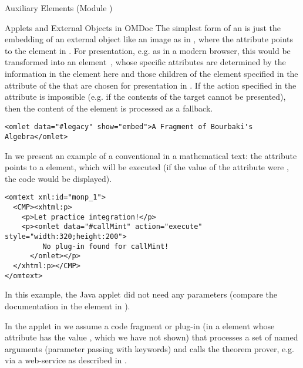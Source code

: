 \begin{tchapter}[id=ext,short=Auxiliary Elements]{Auxiliary Elements (Module {})}
\begin{tsection}[id=applets]{Applets and External Objects in OMDoc}
  The simplest form of an {} is just the embedding of an external object
  like an image as in {}, where the {}
  attribute points to the {} element in {}. For
  presentation, e.g. as {\xhtml} in a modern browser, this would be transformed into an
  {} element~\cite{W3C:xhtml2000}, whose specific attributes
  are determined by the information in the {} element here and those
  {} children of the {} element specified in the
  {} attribute of the {} that are chosen for
  presentation in {\xhtml}. If the action specified in the {}
  attribute is impossible (e.g. if the contents of the {} target
  cannot be presented), then the content of the {} element is processed as
  a fallback.

\begin{lstlisting}[label=lst:omlet-image,
  caption={An {\element{omlet}} for an Image},index={omlet}]
<omlet data="#legacy" show="embed">A Fragment of Bourbaki's Algebra</omlet>
\end{lstlisting}

In {} we present an example of a conventional
{} in a mathematical text: the {}
attribute points to a {} element, which will be executed (if the
value of the {} attribute were
{}, the code would be displayed).

\begin{lstlisting}[label=lst:omlet1,
  caption={An {\element{omlet}} that Calls the Java Applet from {\mylstref{callMint}}.},
  index={omlet}]
<omtext xml:id="monp_1">    
  <CMP><xhtml:p>
    <p>Let practice integration!</p>
    <p><omlet data="#callMint" action="execute" style="width:320;height:200">
         No plug-in found for callMint!
      </omlet></p>
  </xhtml:p></CMP>
</omtext>
\end{lstlisting}

In this example, the Java applet did not need any parameters (compare the
documentation in the {} element in {}). 

In the applet in {} we assume a code fragment or plug-in (in a
{} element whose {} attribute has the value
{}, which we have not shown) that processes a set of named arguments
(parameter passing with keywords) and calls the theorem prover, e.g. via a web-service as
described in {}.


\end{tsection}
\end{tchapter}
